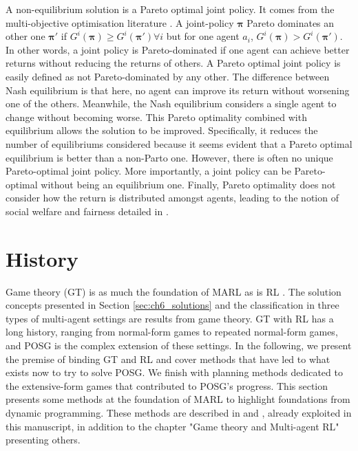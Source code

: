 A non-equilibrium solution is a Pareto optimal joint policy.
It comes from the multi-objective optimisation literature \citep{ehrgott2012vilfredo}.
A joint-policy $\mathbf{\pi}$ Pareto dominates an other one $\mathbf{\pi'}$ if $G^i(\mathbf{\pi}) \ge G^i(\mathbf{\pi'})\forall i$ but for one agent $a_i$, $G^i(\mathbf{\pi}) > G^i(\mathbf{\pi'})$.
In other words, a joint policy is Pareto-dominated if one agent can achieve better returns without reducing the returns of others.
A Pareto optimal joint policy is easily defined as not Pareto-dominated by any other.
The difference between Nash equilibrium is that here, no agent can improve its return without worsening one of the others.
Meanwhile, the Nash equilibrium considers a single agent to change without becoming worse.
This Pareto optimality combined with equilibrium allows the solution to be improved.
Specifically, it reduces the number of equilibriums considered because it seems evident that a Pareto optimal equilibrium is better than a non-Parto one.
However, there is often no unique Pareto-optimal joint policy.
More importantly, a joint policy can be Pareto-optimal without being an equilibrium one.
Finally, Pareto optimality does not consider how the return is distributed amongst agents, leading to the notion of social welfare and fairness detailed in \citep{marl-book}.

\section{History}\label{sec:ch6_history}
Game theory (GT) \citep{von1947theory} is as much the foundation of MARL as is RL \citep{Nowe2012GTMARL, marl-book}.
The solution concepts presented in Section \ref{sec:ch6_solutions} and the classification in three types of multi-agent settings are results from game theory.
GT with RL has a long history, ranging from normal-form games to repeated normal-form games, and POSG is the complex extension of these settings.
In the following, we present the premise of binding GT and RL and cover methods that have led to what exists now to try to solve POSG.
We finish with planning methods dedicated to the extensive-form games that contributed to POSG's progress.
This section presents some methods at the foundation of MARL to highlight foundations from dynamic programming.
These methods are described in \citep{marl-book} and \citep{russel2010}, already exploited in this manuscript, in addition to the chapter "Game theory and Multi-agent RL" \citep{Nowe2012GTMARL} presenting others.

